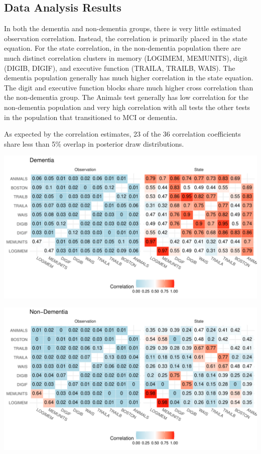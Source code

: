 \documentclass[
]{article}
\begin{document}
\hypertarget{data-analysis-results}{%
\subsection{Data Analysis Results}\label{data-analysis-results}}

In both the dementia and non-dementia groups, there is very little estimated observation correlation. Instead, the correlation is primarily placed in the state equation. For the state correlation, in the non-dementia population there are much distinct correlation clusters in memory (LOGIMEM, MEMUNITS), digit (DIGIB, DIGIF), and executive function (TRAILA, TRAILB, WAIS). The dementia population generally has much higher correlation in the state equation. The digit and executive function blocks share much higher cross correlation than the non-dementia group. The Animals test generally has low correlation for the non-dementia population and very high correlation with all tests the other tests in the population that transitioned to MCI or dementia.

As expected by the correlation estimates, 23 of the 36 correlation coefficients share less than 5\% overlap in posterior draw distributions.

\includegraphics{Master_files/figure-latex/unnamed-chunk-38-1.pdf}

\includegraphics{Master_files/figure-latex/unnamed-chunk-40-1.pdf}
\end{document}

